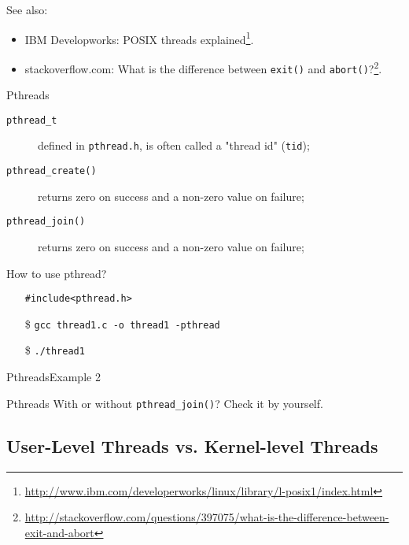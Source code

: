 See also:
\begin{itemize}
\item IBM Developworks: POSIX threads
  explained\footnote{\url{http://www.ibm.com/developerworks/linux/library/l-posix1/index.html}}.
\item stackoverflow.com: What is the difference between \texttt{exit()} and
  \texttt{abort()}?\footnote{\url{http://stackoverflow.com/questions/397075/what-is-the-difference-between-exit-and-abort}}.
\end{itemize}

\begin{frame}{Pthreads}
  \begin{description}
  \item[\texttt{pthread\_t}] defined in \texttt{pthread.h}, is often called a "thread id"
    (\texttt{tid});
  \item[\texttt{pthread\_create()}] returns zero on success and a non-zero value on failure;
  \item[\texttt{pthread\_join()}] returns zero on success and a non-zero value on failure;
  \end{description}
  \begin{block}{How to use pthread?}
    \begin{itemize}
    \item[] \texttt{\#include<pthread.h>}
    \item[\$] \texttt{gcc thread1.c -o thread1 -pthread}
    \item[\$] \texttt{./thread1}
    \end{itemize}
  \end{block}
\end{frame}

\begin{frame}{Pthreads}{Example 2}
  \begin{center}
  \end{center}
\end{frame}

\begin{frame}{Pthreads}
  With or without \texttt{pthread\_join()}? Check it by yourself.
\end{frame}

\subsection{User-Level Threads vs. Kernel-level Threads}
\label{sec:user-threads-vs}

